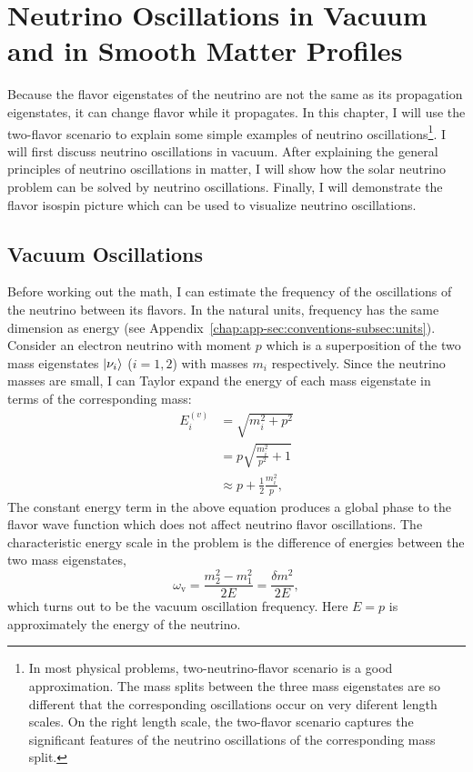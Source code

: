 

\chapter{\label{chap:basics}Neutrino Oscillations in Vacuum and in Smooth Matter Profiles}

Because the flavor eigenstates of the neutrino are not the same as its propagation eigenstates, it can change flavor while it propagates.
In this chapter, I will use the two-flavor scenario to explain some simple examples of neutrino oscillations\footnote{In most physical problems, two-neutrino-flavor scenario is a good approximation. The mass splits between the three mass eigenstates are so different that the corresponding oscillations occur on very diferent length scales. On the right length scale, the two-flavor scenario captures the significant features of the neutrino oscillations of the corresponding mass split.}.
I will first discuss neutrino oscillations in vacuum. After explaining the general principles of neutrino oscillations in matter, I will show how the solar neutrino problem can be solved by neutrino oscillations. Finally, I will demonstrate the flavor isospin picture which can be used to visualize neutrino oscillations.


\section{\label{chap:basics-sec:vacuum-oscillations}Vacuum Oscillations}

Before working out the math, I can estimate the frequency of the oscillations of the neutrino between its flavors. In the natural units, frequency has the same dimension as energy (see Appendix~\ref{chap:app-sec:conventions-subsec:units}). Consider an electron neutrino with moment $p$ which is a superposition of the two mass eigenstates $\left| \nu_i\right\rangle$ ($i=1,2$) with masses $m_i$ respectively. Since the neutrino masses are small, I can Taylor expand the energy of each mass eigenstate in terms of the corresponding mass:
\begin{align}
E_i^{(v)} & = \sqrt{m_i^2 + p^2 } \nonumber\\
& = p \sqrt{\frac{m_i^2}{p^2} + 1} \nonumber\\
& \approx p + \frac{1}{2} \frac{m_i^2}{p},
\label{chap:basics-section:neutrinos-eqn:energy-taylor}
\end{align}
The constant energy term in the above equation produces a global phase to the flavor wave function which does not affect neutrino flavor oscillations. The characteristic energy scale in the problem is the difference of energies between the two mass eigenstates,
\begin{equation}
    \omega_{\mathrm v} =  \frac{m_2^2-m_1^2}{2E} = \frac{\delta m^2}{2E},
    \label{chap:basics-section:neutrinos-eqn:qualitative-method-frequency}
\end{equation}
which turns out to be the vacuum oscillation frequency. Here $E=p$ is approximately the energy of the neutrino.


